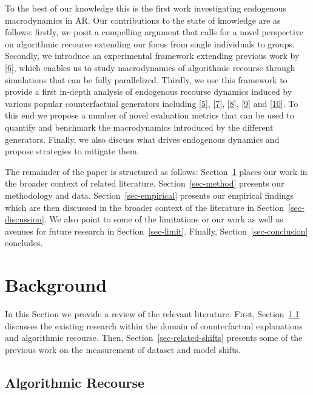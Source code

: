 \documentclass[
  conference]{IEEEtran}
\begin{document}
To the best of our knowledge this is the first work investigating
endogenous macrodynamics in AR. Our contributions to the state of
knowledge are as follows: firstly, we posit a compelling argument that
calls for a novel perspective on algorithmic recourse extending our
focus from single individuals to groups. Secondly, we introduce an
experimental framework extending previous work by
\protect\hyperlink{ref-altmeyer2022CounterfactualExplanations}{{[}6{]}},
which enables us to study macrodynamics of algorithmic recourse through
simulations that can be fully parallelized. Thirdly, we use this
framework to provide a first in-depth analysis of endogenous recourse
dynamics induced by various popular counterfactual generators including
\protect\hyperlink{ref-wachter2017counterfactual}{{[}5{]}},
\protect\hyperlink{ref-schut2021generating}{{[}7{]}},
\protect\hyperlink{ref-joshi2019towards}{{[}8{]}},
\protect\hyperlink{ref-mothilal2020explaining}{{[}9{]}} and
\protect\hyperlink{ref-antoran2020getting}{{[}10{]}}. To this end we
propose a number of novel evaluation metrics that can be used to
quantify and benchmark the macrodynamics introduced by the different
generators. Finally, we also discuss what drives endogenous dynamics and
propose strategies to mitigate them.

The remainder of the paper is structured as follows:
Section~\ref{sec-related} places our work in the broader context of
related literature. Section~\ref{sec-method} presents our methodology
and data. Section~\ref{sec-empirical} presents our empirical findings
which are then discussed in the broader context of the literature in
Section~\ref{sec-discussion}. We also point to some of the limitations
or our work as well as avenues for future research in
Section~\ref{sec-limit}. Finally, Section~\ref{sec-conclusion}
concludes.

\hypertarget{sec-related}{%
\section{Background}\label{sec-related}}

In this Section we provide a review of the relevant literature. First,
Section~\ref{sec-related-recourse} discusses the existing research
within the domain of counterfactual explanations and algorithmic
recourse. Then, Section~\ref{sec-related-shifts} presents some of the
previous work on the measurement of dataset and model shifts.

\hypertarget{sec-related-recourse}{%
\subsection{Algorithmic Recourse}\label{sec-related-recourse}}
\end{document}
